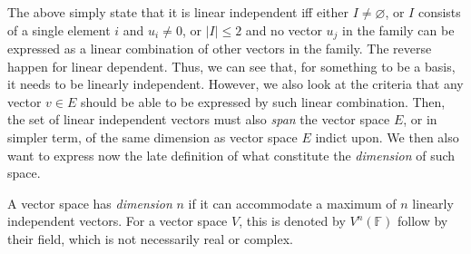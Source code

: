The above simply state that it is linear independent iff either $I\neq \varnothing$, or $I$ consists of a single element $i$ and $u_i \neq 0$, or $|I|\leq 2$ and no vector $u_{j}$ in the family can be expressed as a linear combination of other vectors in the family. The reverse happen for linear dependent. Thus, we can see that, for something to be a basis, it needs to be linearly independent. However, we also look at the criteria that any vector $v\in E$ should be able to be expressed by such linear combination. Then, the set of linear independent vectors must also \textit{span} the vector space $E$, or in simpler term, of the same dimension as vector space $E$ indict upon. We then also want to express now the late definition of what constitute the \textit{dimension} of such space. 

\begin{definition}[Dimension]
    A vector space has \textit{dimension} $n$ if it can accommodate a maximum of $n$ linearly independent vectors. For a vector space $V$, this is denoted by $V^{n}(\mathbb{F})$ follow by their field, which is not necessarily real or complex. 
\end{definition}

